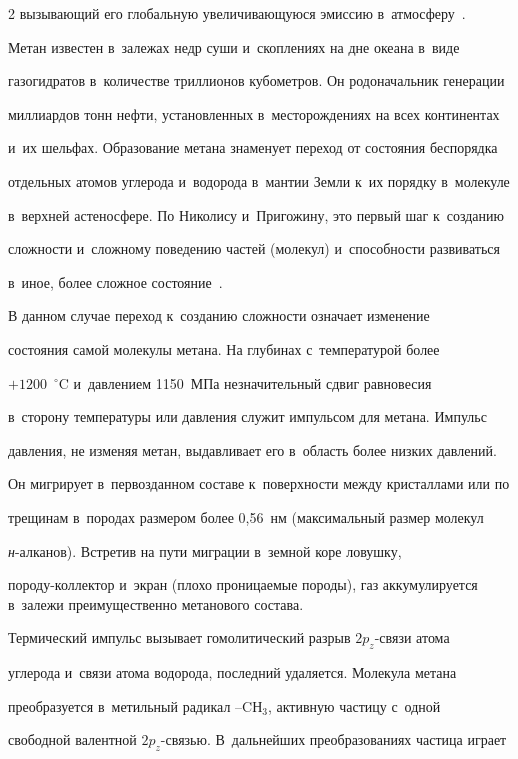 \begin{multicols}{2}
вызывающий его глобальную увеличивающуюся эмиссию в~атмосферу~\cite{7-s}. 

Метан известен в~залежах недр суши и~скоплениях на дне океана в~виде 

газогидратов в~количестве триллионов кубометров. Он родоначальник генерации 

миллиардов тонн нефти, установленных в~месторождениях на всех континентах 

и~их шельфах. Образование метана знаменует переход от состояния беспорядка 

отдельных атомов углерода и~водорода в~мантии Земли к~их порядку в~молекуле 

в~верхней астеносфере. По Николису и~Пригожину, это первый шаг к~созданию 

сложности и~сложному поведению час\-тей (молекул) и~способности развиваться 

в~иное, более сложное состояние~\cite[с.~25--35]{8-s}. 

    

    В данном случае переход к~созданию сложности означает изменение 

состояния самой молекулы метана. На глубинах с~температурой более 

$+1200$~$^\circ$C и~давлением 1150~МПа незначительный сдвиг равновесия 

в~сторону температуры или давления служит импульсом для метана. Импульс 

давления, не изменяя метан, выдавливает его в~область более низких давлений. 

Он мигрирует в~первозданном составе к~поверхности между кристаллами или по 

трещинам в~породах размером более 0,56~нм (максимальный размер молекул  

\textit{н}-ал\-ка\-нов). Встретив на пути миграции в~земной коре ловушку,  

по\-ро\-ду-кол\-лек\-тор и~экран (плохо проницаемые породы), газ аккумулируется в~залежи преимущественно метанового состава. 

    

    Термический импульс вызывает гомолитический разрыв $2p_z$-свя\-зи атома 

углерода и~связи атома водорода, последний удаляется. Молекула метана 

преобразуется в~метильный радикал --CН$_3$, активную частицу с~одной 

свободной валентной \mbox{$2p_z$-связью}. В~дальнейших преобразованиях частица играет 


\end{multicols}
